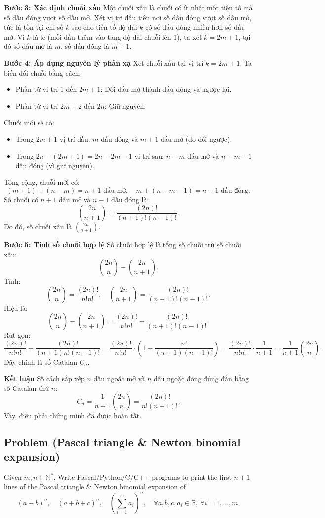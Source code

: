 \documentclass[a4paper,12pt]{article}
\begin{document}
\textbf{Bước 3: Xác định chuỗi xấu}
Một chuỗi xấu là chuỗi có ít nhất một tiền tố mà số dấu đóng vượt số dấu mở. Xét vị trí đầu tiên nơi số dấu đóng vượt số dấu mở, tức là tồn tại chỉ số \( k \) sao cho tiền tố độ dài \( k \) có số dấu đóng nhiều hơn số dấu mở. Vì \( k \) là lẻ (mỗi dấu thêm vào tăng độ dài chuỗi lên 1), ta xét \( k = 2m+1 \), tại đó số dấu mở là \( m \), số dấu đóng là \( m+1 \).

\textbf{Bước 4: Áp dụng nguyên lý phản xạ}
Xét chuỗi xấu tại vị trí \( k = 2m+1 \). Ta biến đổi chuỗi bằng cách:
\begin{itemize}
    \item Phần từ vị trí 1 đến \( 2m+1 \): Đổi dấu mở thành dấu đóng và ngược lại.
    \item Phần từ vị trí \( 2m+2 \) đến \( 2n \): Giữ nguyên.
\end{itemize}
Chuỗi mới sẽ có:
\begin{itemize}
    \item Trong \( 2m+1 \) vị trí đầu: \( m \) dấu đóng và \( m+1 \) dấu mở (do đổi ngược).
    \item Trong \( 2n - (2m+1) = 2n-2m-1 \) vị trí sau: \( n-m \) dấu mở và \( n-m-1 \) dấu đóng (vì giữ nguyên).
\end{itemize}
Tổng cộng, chuỗi mới có:
\[
(m+1) + (n-m) = n+1 \text{ dấu mở}, \quad m + (n-m-1) = n-1 \text{ dấu đóng}.
\]
Số chuỗi có \( n+1 \) dấu mở và \( n-1 \) dấu đóng là:
\[
\binom{2n}{n+1} = \frac{(2n)!}{(n+1)!(n-1)!}.
\]
Do đó, số chuỗi xấu là \( \binom{2n}{n+1} \).

\textbf{Bước 5: Tính số chuỗi hợp lệ}
Số chuỗi hợp lệ là tổng số chuỗi trừ số chuỗi xấu:
\[
\binom{2n}{n} - \binom{2n}{n+1}.
\]
Tính:
\[
\binom{2n}{n} = \frac{(2n)!}{n!n!}, \quad \binom{2n}{n+1} = \frac{(2n)!}{(n+1)!(n-1)!}.
\]
Hiệu là:
\[
\binom{2n}{n} - \binom{2n}{n+1} = \frac{(2n)!}{n!n!} - \frac{(2n)!}{(n+1)!(n-1)!}.
\]
Rút gọn:
\[
\frac{(2n)!}{n!n!} - \frac{(2n)!}{(n+1)n!(n-1)!} = \frac{(2n)!}{n!n!} \cdot \left( 1 - \frac{n!}{(n+1)(n-1)!} \right) = \frac{(2n)!}{n!n!} \cdot \frac{1}{n+1} = \frac{1}{n+1} \binom{2n}{n}.
\]
Đây chính là số Catalan \( C_n \).

\textbf{Kết luận}
Số cách sắp xếp \( n \) dấu ngoặc mở và \( n \) dấu ngoặc đóng đúng đắn bằng số Catalan thứ \( n \):
\[
C_n = \frac{1}{n+1} \binom{2n}{n} = \frac{(2n)!}{n!(n+1)!}.
\]
Vậy, điều phải chứng minh đã được hoàn tất.

\subsection*{Problem (Pascal triangle \& Newton binomial expansion)}
Given $m, n \in \mathbb{N}^*$. Write Pascal/Python/C/C++ programs to print the first $n+1$ lines of the Pascal triangle \& Newton binomial expansion of
\[
(a + b)^n, \quad (a + b + c)^n, \quad \left( \sum_{i=1}^m a_i \right)^n,\quad \forall a, b, c, a_i \in \mathbb{R},\ \forall i = 1, \ldots, m.
\]
\end{document}
